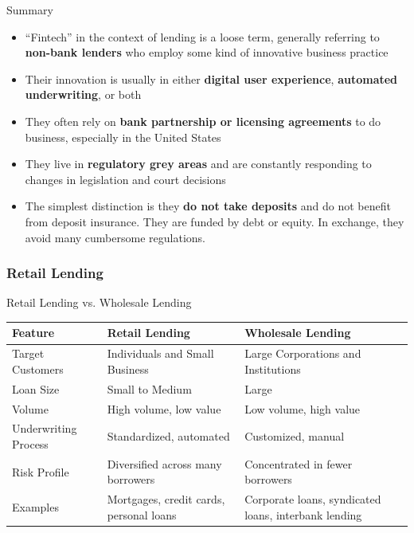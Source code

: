\documentclass[aspectratio=169,xcolor=dvipsnames]{beamer}
\begin{document}
\begin{frame}{Summary}

\begin{itemize}
    \item ``Fintech'' in the context of lending is a loose term, generally referring to \textbf{non-bank lenders} who employ some kind of innovative business practice 
    \item Their innovation is usually in either \textbf{digital user experience}, \textbf{automated underwriting}, or both 
    \item They often rely on \textbf{bank partnership or licensing agreements} to do business, especially in the United States
    \item They live in \textbf{regulatory grey areas} and are constantly responding to changes in legislation and court decisions 
    \item The simplest distinction is they \textbf{do not take deposits} and do not benefit from deposit insurance. They are funded by debt or equity. In exchange, they avoid many cumbersome regulations. 
\end{itemize}
    
\end{frame}



\begin{frame}
\frametitle{Retail Lending}


Retail Lending vs. Wholesale Lending \\

\begin{table}[H]
\centering
\begin{tabular}{@{}p{3.5cm}p{4.5cm}p{4.5cm}@{}}
\toprule
\textbf{Feature} & \textbf{Retail Lending} & \textbf{Wholesale Lending} \\ 
\midrule
Target Customers & Individuals and Small Business & Large Corporations and Institutions\\
\hline 
Loan Size & Small to Medium & Large \\
\hline 
Volume & High volume, low value & Low volume, high value \\
\hline 
Underwriting Process & Standardized, automated & Customized, manual \\
\hline 
Risk Profile & Diversified across many borrowers & Concentrated in fewer borrowers \\
\hline 
Examples & Mortgages, credit cards, personal loans & Corporate loans, syndicated loans, interbank lending \\ 
\bottomrule
\end{tabular}
\end{table}


	
\end{frame} 
\end{document}
